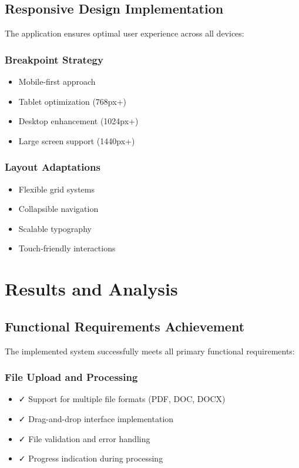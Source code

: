 \documentclass[12pt,a4paper]{article}
\begin{document}
\subsection{Responsive Design Implementation}
The application ensures optimal user experience across all devices:

\subsubsection{Breakpoint Strategy}
\begin{itemize}
    \item Mobile-first approach
    \item Tablet optimization (768px+)
    \item Desktop enhancement (1024px+)
    \item Large screen support (1440px+)
\end{itemize}

\subsubsection{Layout Adaptations}
\begin{itemize}
    \item Flexible grid systems
    \item Collapsible navigation
    \item Scalable typography
    \item Touch-friendly interactions
\end{itemize}

\section{Results and Analysis}

\subsection{Functional Requirements Achievement}
The implemented system successfully meets all primary functional requirements:

\subsubsection{File Upload and Processing}
\begin{itemize}
    \item ✓ Support for multiple file formats (PDF, DOC, DOCX)
    \item ✓ Drag-and-drop interface implementation
    \item ✓ File validation and error handling
    \item ✓ Progress indication during processing
\end{itemize}
\end{document}
